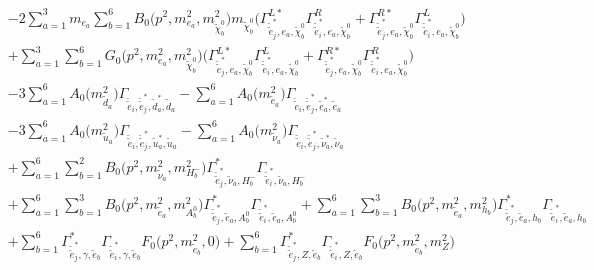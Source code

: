 \begin{itemize}
\begin{align}
 &-2 \sum_{a=1}^{3}m_{e_{{a}}} \sum_{b=1}^{6}{B_0\Big(p^{2},m^2_{e_{{a}}},m^2_{\tilde{\chi}^0_{{b}}}\Big)} m_{\tilde{\chi}^0_{{b}}} \Big({\Gamma^{L*}_{\check{\tilde{e}}^*_{{j}},e_{{a}},\tilde{\chi}^0_{{b}}}} {\Gamma^R_{\check{\tilde{e}}^*_{{i}},e_{{a}},\tilde{\chi}^0_{{b}}}}  + {\Gamma^{R*}_{\check{\tilde{e}}^*_{{j}},e_{{a}},\tilde{\chi}^0_{{b}}}} {\Gamma^L_{\check{\tilde{e}}^*_{{i}},e_{{a}},\tilde{\chi}^0_{{b}}}} \Big)  \nonumber \\ 
 &+\sum_{a=1}^{3}\sum_{b=1}^{6}{G_0\Big(p^{2},m^2_{e_{{a}}},m^2_{\tilde{\chi}^0_{{b}}}\Big)} \Big({\Gamma^{L*}_{\check{\tilde{e}}^*_{{j}},e_{{a}},\tilde{\chi}^0_{{b}}}} {\Gamma^L_{\check{\tilde{e}}^*_{{i}},e_{{a}},\tilde{\chi}^0_{{b}}}}  + {\Gamma^{R*}_{\check{\tilde{e}}^*_{{j}},e_{{a}},\tilde{\chi}^0_{{b}}}} {\Gamma^R_{\check{\tilde{e}}^*_{{i}},e_{{a}},\tilde{\chi}^0_{{b}}}} \Big)\nonumber \\ 
 &-3 \sum_{a=1}^{6}{A_0\Big(m^2_{\tilde{d}_{{a}}}\Big)} {\Gamma_{\check{\tilde{e}}_{{i}},\check{\tilde{e}}^*_{{j}},\tilde{d}^*_{{a}},\tilde{d}_{{a}}}}  - \sum_{a=1}^{6}{A_0\Big(m^2_{\tilde{e}_{{a}}}\Big)} {\Gamma_{\check{\tilde{e}}_{{i}},\check{\tilde{e}}^*_{{j}},\tilde{e}^*_{{a}},\tilde{e}_{{a}}}}  \nonumber \\ 
 &-3 \sum_{a=1}^{6}{A_0\Big(m^2_{\tilde{u}_{{a}}}\Big)} {\Gamma_{\check{\tilde{e}}_{{i}},\check{\tilde{e}}^*_{{j}},\tilde{u}^*_{{a}},\tilde{u}_{{a}}}}  - \sum_{a=1}^{6}{A_0\Big(m^2_{\tilde{\nu}_{{a}}}\Big)} {\Gamma_{\check{\tilde{e}}_{{i}},\check{\tilde{e}}^*_{{j}},\tilde{\nu}^*_{{a}},\tilde{\nu}_{{a}}}}  \nonumber \\ 
 &+\sum_{a=1}^{6}\sum_{b=1}^{2}{B_0\Big(p^{2},m^2_{\tilde{\nu}_{{a}}},m^2_{H^-_{{b}}}\Big)} {\Gamma^*_{\check{\tilde{e}}^*_{{j}},\tilde{\nu}_{{a}},H^-_{{b}}}} {\Gamma_{\check{\tilde{e}}^*_{{i}},\tilde{\nu}_{{a}},H^-_{{b}}}} \nonumber \\ 
 &+\sum_{a=1}^{6}\sum_{b=1}^{3}{B_0\Big(p^{2},m^2_{\tilde{e}_{{a}}},m^2_{A^0_{{b}}}\Big)} {\Gamma^*_{\check{\tilde{e}}^*_{{j}},\tilde{e}_{{a}},A^0_{{b}}}} {\Gamma_{\check{\tilde{e}}^*_{{i}},\tilde{e}_{{a}},A^0_{{b}}}} +\sum_{a=1}^{6}\sum_{b=1}^{3}{B_0\Big(p^{2},m^2_{\tilde{e}_{{a}}},m^2_{h_{{b}}}\Big)} {\Gamma^*_{\check{\tilde{e}}^*_{{j}},\tilde{e}_{{a}},h_{{b}}}} {\Gamma_{\check{\tilde{e}}^*_{{i}},\tilde{e}_{{a}},h_{{b}}}} \nonumber \\ 
 &+\sum_{b=1}^{6}{\Gamma^*_{\check{\tilde{e}}^*_{{j}},\gamma,\tilde{e}_{{b}}}} {\Gamma_{\check{\tilde{e}}^*_{{i}},\gamma,\tilde{e}_{{b}}}} {F_0\Big(p^{2},m^2_{\tilde{e}_{{b}}},0\Big)} +\sum_{b=1}^{6}{\Gamma^*_{\check{\tilde{e}}^*_{{j}},Z,\tilde{e}_{{b}}}} {\Gamma_{\check{\tilde{e}}^*_{{i}},Z,\tilde{e}_{{b}}}} {F_0\Big(p^{2},m^2_{\tilde{e}_{{b}}},m^2_{Z}\Big)} \nonumber \\ 

\end{align}
\end{itemize}
